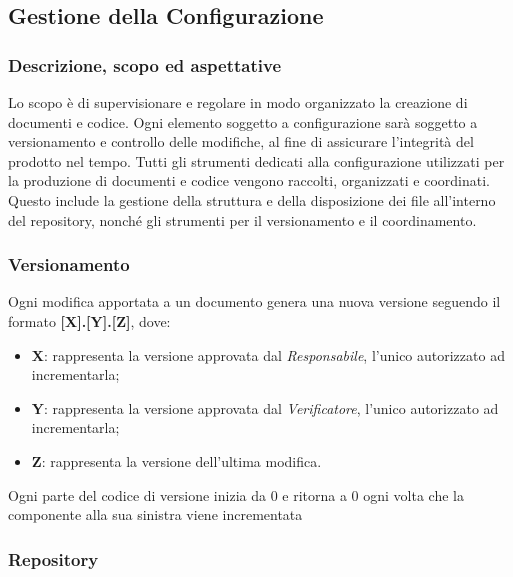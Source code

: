 \subsection{Gestione della Configurazione}

\subsubsection{Descrizione, scopo ed aspettative}
    Lo scopo è di supervisionare e regolare in modo organizzato la creazione di 
    documenti e codice. Ogni elemento soggetto a configurazione sarà soggetto a versionamento
    e controllo delle modifiche, al fine di assicurare l'integrità del prodotto 
    nel tempo.
    Tutti gli strumenti dedicati alla configurazione utilizzati per la produzione
    di documenti e codice vengono raccolti, organizzati e coordinati. Questo include
    la gestione della struttura e della disposizione dei file all'interno del repository, 
    nonché gli strumenti per il versionamento e il coordinamento.

\subsubsection{Versionamento}
Ogni modifica apportata a un documento genera una nuova versione seguendo il formato
\textbf{[X].[Y].[Z]}, dove:
\begin{itemize}
    \item \textbf{X}: rappresenta la versione approvata dal \emph{Responsabile}, l'unico autorizzato ad incrementarla;
    \item \textbf{Y}: rappresenta la versione approvata dal \emph{Verificatore}, l'unico autorizzato ad incrementarla;
    \item \textbf{Z}: rappresenta la versione dell'ultima modifica.
\end{itemize}
Ogni parte del codice di versione inizia da 0 e ritorna a 0 ogni volta che la componente alla sua sinistra
viene incrementata
\subsubsection{Repository}


